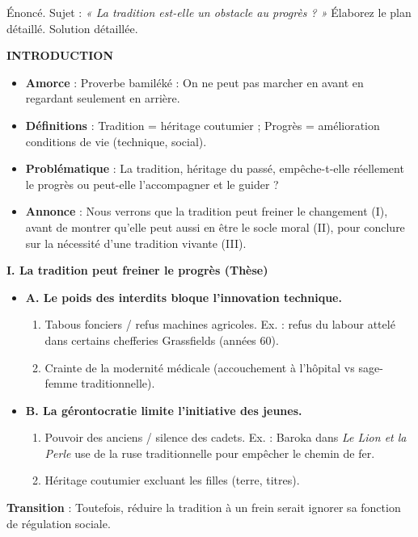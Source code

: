 \documentclass[11pt]{article}
\begin{document}
\begin{exoresolu}
Énoncé. Sujet : \emph{« La tradition est-elle un obstacle au progrès ? »} Élaborez le plan détaillé.
\tcblower
Solution détaillée.

\textbf{INTRODUCTION}
\begin{itemize}
\item \textbf{Amorce} : Proverbe bamiléké : \og On ne peut pas marcher en avant en regardant seulement en arrière. \fg
\item \textbf{Définitions} : Tradition = héritage coutumier ; Progrès = amélioration conditions de vie (technique, social).
\item \textbf{Problématique} : La tradition, héritage du passé, empêche-t-elle réellement le progrès ou peut-elle l'accompagner et le guider ?
\item \textbf{Annonce} : Nous verrons que la tradition peut freiner le changement (I), avant de montrer qu'elle peut aussi en être le socle moral (II), pour conclure sur la nécessité d'une tradition vivante (III).
\end{itemize}

\textbf{I. La tradition peut freiner le progrès (Thèse)}
\begin{itemize}
\item \textbf{A. Le poids des interdits bloque l'innovation technique.}
  \begin{enumerate}
  \item Tabous fonciers / refus machines agricoles. Ex. : refus du labour attelé dans certains chefferies Grassfields (années 60).
  \item Crainte de la modernité médicale (accouchement à l'hôpital vs sage-femme traditionnelle).
  \end{enumerate}
\item \textbf{B. La gérontocratie limite l'initiative des jeunes.}
  \begin{enumerate}
  \item Pouvoir des anciens / silence des cadets. Ex. : Baroka dans \emph{Le Lion et la Perle} use de la ruse traditionnelle pour empêcher le chemin de fer.
  \item Héritage coutumier excluant les filles (terre, titres).
  \end{enumerate}
\end{itemize}
\textbf{Transition} : \og Toutefois, réduire la tradition à un frein serait ignorer sa fonction de régulation sociale. \fg


\end{exoresolu}
\end{document}

